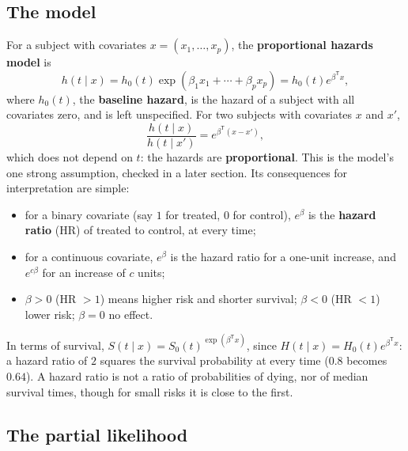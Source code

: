 \documentclass[11pt,a4paper]{article}
\numberwithin{equation}{section}
\theoremstyle{definition}
\begin{document}
\subsection{The model}
\label{ssec:coxmodel}

For a subject with covariates $x = (x_1, \ldots, x_p)$, the \textbf{proportional hazards model} is
\[
h(t \mid x) = h_0(t)\exp(\beta_1x_1 + \cdots + \beta_px_p) = h_0(t)e^{\beta^{\mathsf T}x} ,
\]
where $h_0(t)$, the \textbf{baseline hazard}, is the hazard of a subject with all covariates zero, and is left unspecified. For two subjects with covariates $x$ and $x'$,
\[
\frac{h(t \mid x)}{h(t \mid x')} = e^{\beta^{\mathsf T}(x - x')} ,
\]
which does not depend on $t$: the hazards are \textbf{proportional}. This is the model's one strong assumption, checked in a later section. Its consequences for interpretation are simple:
\begin{itemize}
\item for a binary covariate (say $1$ for treated, $0$ for control), $e^{\beta}$ is the \textbf{hazard ratio} (HR) of treated to control, at every time;
\item for a continuous covariate, $e^{\beta}$ is the hazard ratio for a one-unit increase, and $e^{c\beta}$ for an increase of $c$ units;
\item $\beta > 0$ (HR $> 1$) means higher risk and shorter survival; $\beta < 0$ (HR $< 1$) lower risk; $\beta = 0$ no effect.
\end{itemize}
In terms of survival, $S(t \mid x) = S_0(t)^{\exp(\beta^{\mathsf T}x)}$, since $H(t \mid x) = H_0(t)e^{\beta^{\mathsf T}x}$: a hazard ratio of $2$ squares the survival probability at every time ($0.8$ becomes $0.64$). A hazard ratio is not a ratio of probabilities of dying, nor of median survival times, though for small risks it is close to the first.

\subsection{The partial likelihood}
\label{ssec:partial}
\end{document}
